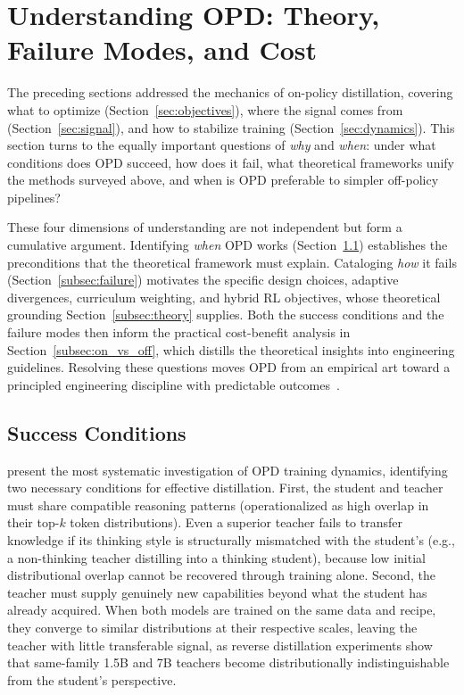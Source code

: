 \documentclass{article} %
\begin{document}
\section{Understanding OPD: Theory, Failure Modes, and Cost}
\label{sec:understanding}

The preceding sections addressed the mechanics of on-policy distillation, covering what to optimize (Section~\ref{sec:objectives}), where the signal comes from (Section~\ref{sec:signal}), and how to stabilize training (Section~\ref{sec:dynamics}). This section turns to the equally important questions of \emph{why} and \emph{when}: under what conditions does OPD succeed, how does it fail, what theoretical frameworks unify the methods surveyed above, and when is OPD preferable to simpler off-policy pipelines?

These four dimensions of understanding are not independent but form a cumulative argument. Identifying \emph{when} OPD works (Section~\ref{subsec:success}) establishes the preconditions that the theoretical framework must explain. Cataloging \emph{how} it fails (Section~\ref{subsec:failure}) motivates the specific design choices, adaptive divergences, curriculum weighting, and hybrid RL objectives, whose theoretical grounding Section~\ref{subsec:theory} supplies. Both the success conditions and the failure modes then inform the practical cost-benefit analysis in Section~\ref{subsec:on_vs_off}, which distills the theoretical insights into engineering guidelines. Resolving these questions moves OPD from an empirical art toward a principled engineering discipline with predictable outcomes~\citep{2602.12222, li2026rethinking}.

\subsection{Success Conditions}
\label{subsec:success}

\citet{li2026rethinking} present the most systematic investigation of OPD training dynamics, identifying two necessary conditions for effective distillation. First, the student and teacher must share compatible reasoning patterns (operationalized as high overlap in their top-$k$ token distributions). Even a superior teacher fails to transfer knowledge if its thinking style is structurally mismatched with the student's (e.g., a non-thinking teacher distilling into a thinking student), because low initial distributional overlap cannot be recovered through training alone. Second, the teacher must supply genuinely new capabilities beyond what the student has already acquired. When both models are trained on the same data and recipe, they converge to similar distributions at their respective scales, leaving the teacher with little transferable signal, as reverse distillation experiments show that same-family 1.5B and 7B teachers become distributionally indistinguishable from the student's perspective.
\end{document}
